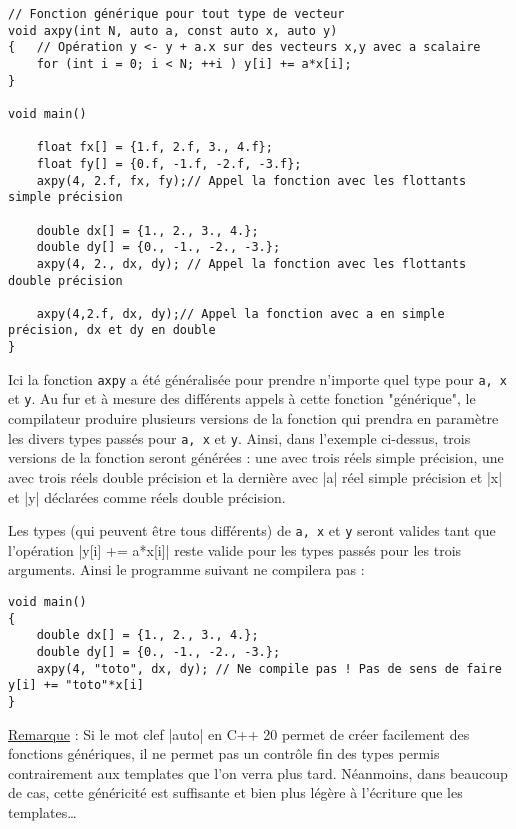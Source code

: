 \begin{itemize}
\begin{lstlisting}[caption=utilisation du mot clef auto pour déclarer les paramètres de la fonction]
// Fonction générique pour tout type de vecteur
void axpy(int N, auto a, const auto x, auto y)
{   // Opération y <- y + a.x sur des vecteurs x,y avec a scalaire
    for (int i = 0; i < N; ++i ) y[i] += a*x[i];
}

void main()

    float fx[] = {1.f, 2.f, 3., 4.f};
    float fy[] = {0.f, -1.f, -2.f, -3.f};
    axpy(4, 2.f, fx, fy);// Appel la fonction avec les flottants simple précision

    double dx[] = {1., 2., 3., 4.};
    double dy[] = {0., -1., -2., -3.};
    axpy(4, 2., dx, dy); // Appel la fonction avec les flottants double précision

    axpy(4,2.f, dx, dy);// Appel la fonction avec a en simple précision, dx et dy en double
}
\end{lstlisting}

Ici la fonction \texttt{axpy} a été généralisée pour prendre n'importe quel type pour \texttt{a, x} et \texttt{y}. Au fur et à mesure des différents appels à cette fonction "générique", le compilateur produire plusieurs versions de la fonction qui prendra en paramètre les divers types passés pour \texttt{a, x} et \texttt{y}. Ainsi, dans l'exemple ci-dessus, trois versions de la fonction seront générées : une avec trois réels simple précision, une avec trois réels double précision et la dernière avec |a| réel simple précision et |x| et |y| déclarées comme réels double précision.

Les types (qui peuvent être tous différents) de \texttt{a, x} et \texttt{y} seront valides tant que l'opération |y[i] += a*x[i]| reste valide pour les types passés pour les trois arguments. Ainsi le programme suivant ne compilera pas :

\begin{lstlisting}
void main()
{
    double dx[] = {1., 2., 3., 4.};
    double dy[] = {0., -1., -2., -3.};
    axpy(4, "toto", dx, dy); // Ne compile pas ! Pas de sens de faire y[i] += "toto"*x[i]  
}
\end{lstlisting}

\underline{Remarque} : Si le mot clef |auto| en C++ 20 permet de créer facilement des fonctions génériques, il ne permet pas un contrôle fin des types permis contrairement aux templates que l'on verra plus tard. Néanmoins, dans beaucoup de cas, cette généricité est suffisante et bien plus légère à l'écriture que les templates\ldots


\end{itemize}
